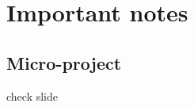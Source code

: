 \documentclass{article}
\begin{document}
\section{Important notes}
\subsection{Micro-project}
check slide
\end{document}
